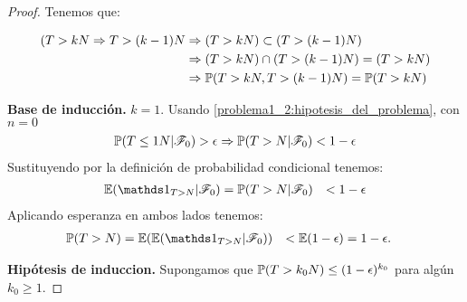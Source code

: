\begin{proof}
	Tenemos que: 
	
	\begin{align}
		(T>kN \Rightarrow T>(k-1)N 	&\Rightarrow (T>kN) \subset (T>(k-1)N) \\ 
									&\Rightarrow (T>kN) \cap (T>(k-1)N) = (T>kN) \\ 
									&\Rightarrow \mathbb{P}(T>kN, T>(k-1)N) = \mathbb{P}(T>kN)	
	\end{align}
		
	\textbf{Base de inducción.} $k=1$. Usando \eqref{problema1_2:hipotesis_del_problema}, con $n=0$ 
	\begin{align}
		\mathbb{P}(T\leq 1N | \mathscr{F}_0) > \epsilon\Rightarrow
		\mathbb{P}(T>N| \mathscr{F}_0) < 1 - \epsilon
	\end{align}
	Sustituyendo por la definición de probabilidad condicional tenemos:
		\begin{align}
			\E(\indic_{T>N} | \F_0)	&= \mw(T>N| \F_0) 
									&< 1 - \epsilon
		\end{align}
	Aplicando esperanza en ambos lados tenemos:
		\begin{align} 
			\mw(T>N) 	&= 	\E(\E(\indic_{T>N} | \F_0)) 
						&< 	\E(1 - \epsilon) 
						&= 1 - \epsilon.
		\end{align}
	
	\textbf{Hipótesis de induccion.} Supongamos que $\mathbb{P}(T>k_0N)\leq(1 - \epsilon)^{k_0}$ para algún $k_0 \geq 1$.
	

\end{proof}
